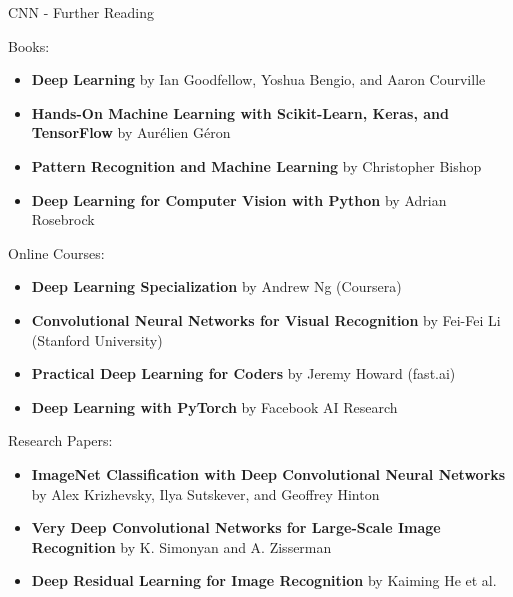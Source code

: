 \begin{frame}{CNN - Further Reading}
\begin{block}{Books:}
    \begin{itemize}
    \item \textbf{Deep Learning} by Ian Goodfellow, Yoshua Bengio, and Aaron Courville \vspace{0.5em}
    \item \textbf{Hands-On Machine Learning with Scikit-Learn, Keras, and TensorFlow} by Aurélien Géron \vspace{0.5em}
    \item \textbf{Pattern Recognition and Machine Learning} by Christopher Bishop \vspace{0.5em}
    \item \textbf{Deep Learning for Computer Vision with Python} by Adrian Rosebrock
    \end{itemize}
\end{block}
\framebreak
\begin{block}{Online Courses:}
    \begin{itemize}
        \item \textbf{Deep Learning Specialization} by Andrew Ng (Coursera) \vspace{0.5em}
        \item \textbf{Convolutional Neural Networks for Visual Recognition} by Fei-Fei Li (Stanford University) \vspace{0.5em}
        \item \textbf{Practical Deep Learning for Coders} by Jeremy Howard (fast.ai) \vspace{0.5em}
        \item \textbf{Deep Learning with PyTorch} by Facebook AI Research \vspace{0.5em}
    \end{itemize}
\end{block}
\framebreak
\begin{block}{Research Papers:}
    \begin{itemize}
        \item \textbf{ImageNet Classification with Deep Convolutional Neural Networks} by Alex Krizhevsky, Ilya Sutskever, and Geoffrey Hinton \vspace{0.5em}
        \item \textbf{Very Deep Convolutional Networks for Large-Scale Image Recognition} by K. Simonyan and A. Zisserman \vspace{0.5em}
        \item \textbf{Deep Residual Learning for Image Recognition} by Kaiming He et al. \vspace{0.5em}

\end{itemize}
\end{block}
\end{frame}
